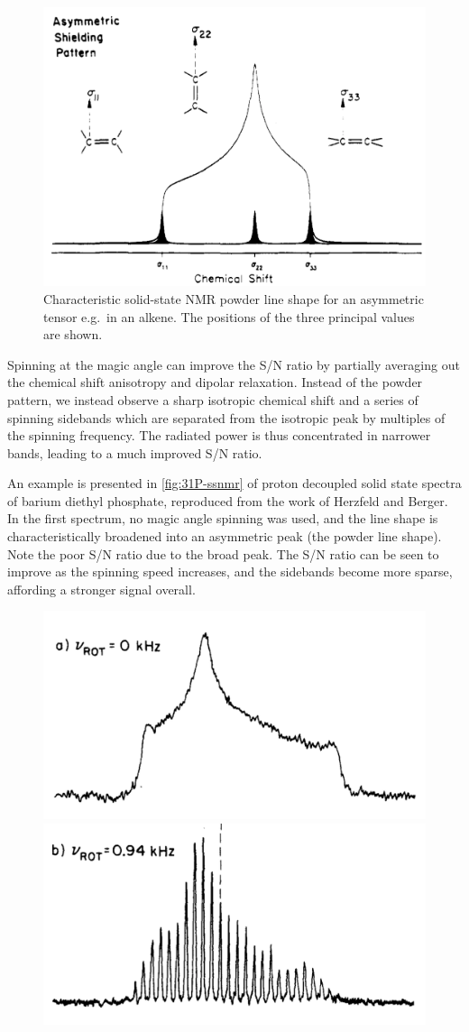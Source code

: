 \begin{refsection}
\begin{figure}
  \centering
  \includegraphics[width=0.45\linewidth]{Figures/ssnmr-tensor.pdf}
  \caption[SS-NMR powder line shape]{Characteristic solid-state NMR powder line shape for an asymmetric tensor e.g.\ in an alkene. The positions of the three principal values are shown.}\label{fig:ssnmr-tensor}
\end{figure}

Spinning at the magic angle can improve the S/N ratio by partially averaging out the chemical shift anisotropy and dipolar relaxation.
Instead of the powder pattern, we instead observe a sharp isotropic chemical shift and a series of spinning sidebands which are separated from the isotropic peak by multiples of the spinning frequency.
The radiated power is thus concentrated in narrower bands, leading to a much improved S/N ratio.

An example is presented in \cref{fig:31P-ssnmr} of proton decoupled solid state  spectra of barium diethyl phosphate, reproduced from the work of Herzfeld and Berger\autocite{Herzfeld1980SidebandAngle}.
In the first spectrum, no magic angle spinning was used, and the line shape is characteristically broadened into an asymmetric peak (the powder line shape).
Note the poor S/N ratio due to the broad peak.
The S/N ratio can be seen to improve as the spinning speed increases, and the sidebands become more sparse, affording a stronger signal overall.

\begin{figure}
    \centering
    \includegraphics[width=0.45\linewidth]{Figures/31P-ssnmr-0khz.pdf}
    \includegraphics[width=0.45\linewidth]{Figures/31P-ssnmr-0.94khz.pdf}


\end{figure}
\end{refsection}
